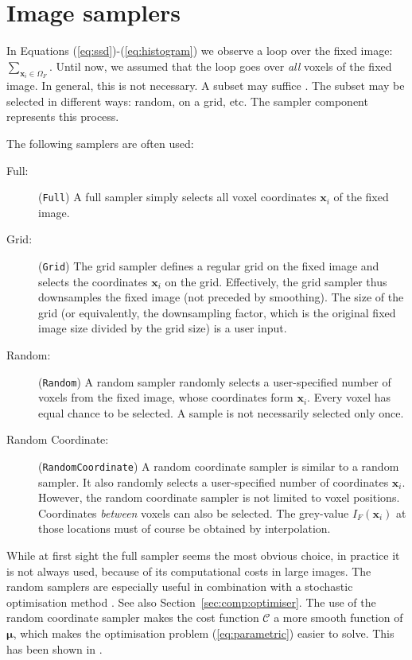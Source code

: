 \documentclass[]{report}
\newcommand{\vx}{\bm{x}}
\newcommand{\vmu}{\bm{\mu}}
\newcommand{\CC}{\mathcal{C}}
\begin{document}
\section{Image samplers}\label{sec:comp:sampler}

In Equations (\ref{eq:ssd})-(\ref{eq:histogram}) we observe a loop
over the fixed image: $\sum_{\vx_i \in \Omega_F}$. Until now, we
assumed that the loop goes over \emph{all} voxels of the fixed
image. In general, this is not necessary. A subset may suffice
\citep{ThevenazEA00a,KleinEA07}. The subset may be selected in
different ways: random, on a grid, etc. The sampler component
represents this process.

The following samplers are often used:
\begin{description}
\item[Full:] (\texttt{Full}) A full sampler simply selects all voxel coordinates $\vx_i$ of the
fixed image.

\item[Grid:] (\texttt{Grid}) The grid sampler defines a regular grid on the fixed
image and selects the coordinates $\vx_i$ on the grid. Effectively,
the grid sampler thus downsamples the fixed image (not preceded by
smoothing). The size of the grid (or equivalently, the downsampling
factor, which is the original fixed image size divided by the grid
size) is a user input.

\item[Random:] (\texttt{Random}) A random sampler randomly selects a user-specified number of
voxels from the fixed image, whose coordinates form $\vx_i$. Every
voxel has equal chance to be selected. A sample is not necessarily
selected only once.

\item[Random Coordinate:] (\texttt{RandomCoordinate}) A random coordinate sampler is similar
to a random sampler. It also randomly selects a user-specified number
of coordinates $\vx_i$. However, the random coordinate sampler is not
limited to voxel positions. Coordinates \emph{between} voxels can
also be selected. The grey-value $I_F(\vx_i)$ at those locations must
of course be obtained by interpolation.

\end{description}

While at first sight the full sampler seems the most obvious
choice, in practice it is not always used, because of its
computational costs in large images. The random samplers are
especially useful in combination with a stochastic optimisation
method \citep{KleinEA07}. See also
Section~\ref{sec:comp:optimiser}. The use of the random coordinate
sampler makes the cost function $\CC$ a more smooth function of
$\vmu$, which makes the optimisation problem (\ref{eq:parametric})
easier to solve. This has been shown in \cite{The08:Halton}.
\end{document}
